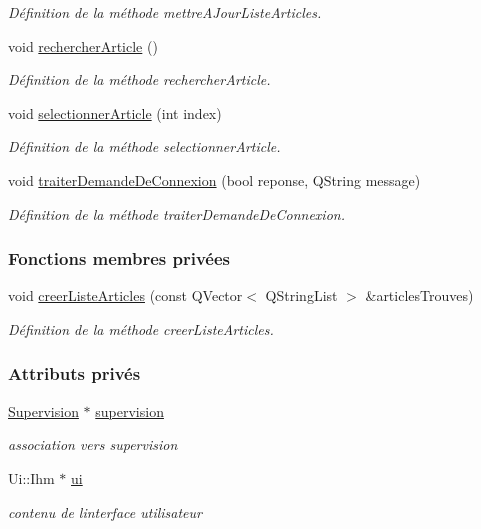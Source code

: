 \begin{DoxyCompactItemize}
\begin{DoxyCompactList}\small\item\em Définition de la méthode mettre\+A\+Jour\+Liste\+Articles. \end{DoxyCompactList}\item 
void \hyperlink{class_ihm_a03b67c17f7bd3b8b2ef8d095f460a6b9}{rechercher\+Article} ()
\begin{DoxyCompactList}\small\item\em Définition de la méthode rechercher\+Article. \end{DoxyCompactList}\item 
void \hyperlink{class_ihm_ad9b83836021fc8542db033da186cc64c}{selectionner\+Article} (int index)
\begin{DoxyCompactList}\small\item\em Définition de la méthode selectionner\+Article. \end{DoxyCompactList}\item 
void \hyperlink{class_ihm_a70f9dcc2df7d4d05ab43a809efeeeb06}{traiter\+Demande\+De\+Connexion} (bool reponse, Q\+String message)
\begin{DoxyCompactList}\small\item\em Définition de la méthode traiter\+Demande\+De\+Connexion. \end{DoxyCompactList}\end{DoxyCompactItemize}
\subsubsection*{Fonctions membres privées}
\begin{DoxyCompactItemize}
\item 
void \hyperlink{class_ihm_ab632796a21015964c8d7615edb09261c}{creer\+Liste\+Articles} (const Q\+Vector$<$ Q\+String\+List $>$ \&articles\+Trouves)
\begin{DoxyCompactList}\small\item\em Définition de la méthode creer\+Liste\+Articles. \end{DoxyCompactList}\end{DoxyCompactItemize}
\subsubsection*{Attributs privés}
\begin{DoxyCompactItemize}
\item 
\hyperlink{class_supervision}{Supervision} $\ast$ \hyperlink{class_ihm_a454ab89ced1b27fcb42d550e443e780c}{supervision}
\begin{DoxyCompactList}\small\item\em association vers supervision \end{DoxyCompactList}\item 
Ui\+::\+Ihm $\ast$ \hyperlink{class_ihm_a0ac5f47856566ceeeca1720109bf70ea}{ui}
\begin{DoxyCompactList}\small\item\em contenu de l\textquotesingle{}interface utilisateur \end{DoxyCompactList}\end{DoxyCompactItemize}


